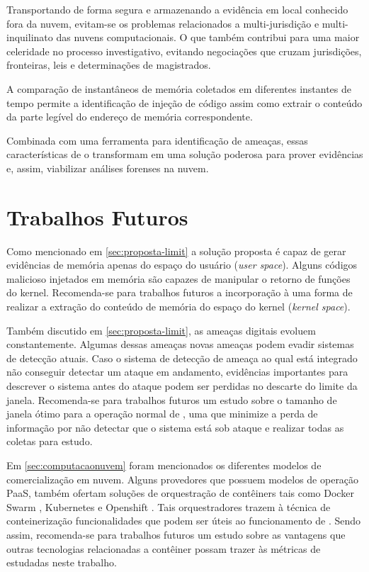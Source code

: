 Transportando de forma segura e armazenando a evidência em local conhecido fora da nuvem, evitam-se os problemas relacionados a multi-jurisdição e multi-inquilinato das nuvens computacionais.
%
O que também contribui para uma maior celeridade no processo investigativo, evitando negociações que cruzam jurisdições, fronteiras, leis e determinações de magistrados.
%

A comparação de instantâneos de memória coletados em diferentes instantes de tempo permite a identificação de injeção de código assim como extrair o conteúdo da parte legível do endereço de memória correspondente.

%
Combinada com uma ferramenta para identificação de ameaças, essas características de \fancyname o transformam em uma solução poderosa para prover evidências e, assim, viabilizar análises forenses na nuvem.

\section{Trabalhos Futuros}
\label{sec: proposta-trab-fut}

%
Como mencionado em \ref{sec:proposta-limit} a solução proposta é capaz de gerar evidências de memória apenas do espaço do usuário (\textit{user space}). 
%
Alguns códigos malicioso injetados em memória são capazes de manipular o retorno de funções do kernel. 
%
Recomenda-se para trabalhos futuros a incorporação à \fancyname uma forma de realizar a extração do conteúdo de memória do espaço do kernel (\textit{kernel space}).
%

Também discutido em \ref{sec:proposta-limit}, as ameaças digitais evoluem constantemente.
%
Algumas dessas ameaças novas ameaças podem evadir sistemas de detecção atuais.
%
Caso o sistema de detecção de ameaça ao qual \fancyname está integrado não conseguir detectar um ataque em andamento, evidências importantes para descrever o sistema antes do ataque podem ser perdidas no descarte do limite da janela.
%
Recomenda-se para trabalhos futuros um estudo sobre o tamanho de janela ótimo para a operação normal de \fancyname, uma que minimize a perda de informação por não detectar que o sistema está sob ataque e realizar todas as coletas para estudo.
%

Em \ref{sec:computacaonuvem} foram mencionados os diferentes modelos de comercialização em nuvem.
%
Alguns provedores que possuem modelos de operação PaaS, também ofertam soluções de orquestração de contêiners tais como Docker Swarm \cite{Swarm}, Kubernetes \cite{Kubernetes} e Openshift \cite{Openshift}.
%
Tais orquestradores trazem à técnica de conteinerização funcionalidades que podem ser úteis ao funcionamento de \fancynameX.
%
Sendo assim, recomenda-se para trabalhos futuros um estudo sobre as vantagens que outras tecnologias relacionadas a contêiner possam trazer às métricas de \fancyname estudadas neste trabalho.
%

